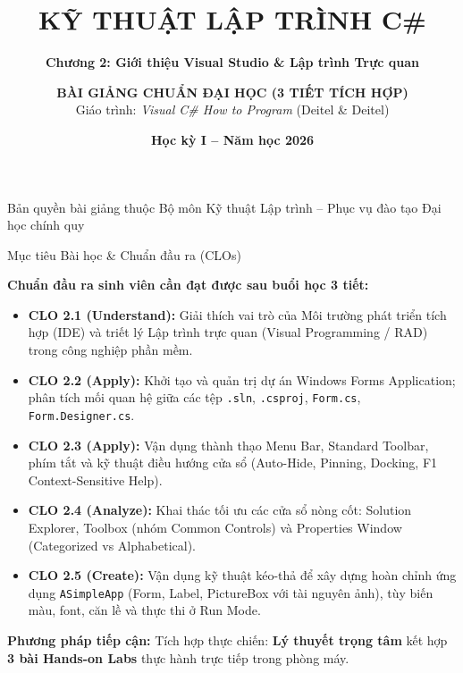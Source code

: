\documentclass[aspectratio=169, 10pt]{beamer}
\title[\textbf{Lập trình C\# \& .NET -- Chương 2}]{\textbf{\LARGE KỸ THUẬT LẬP TRÌNH C\#}}
\subtitle{\textbf{\large Chương 2: Giới thiệu Visual Studio \& Lập trình Trực quan}}
\author[\textbf{Khoa CNTT -- IT26M}]{\textbf{BÀI GIẢNG CHUẨN ĐẠI HỌC (3 TIẾT TÍCH HỢP)}\\Giáo trình: \textit{Visual C\# How to Program} (Deitel \& Deitel)}
\institute[\textbf{Lớp IT26M}]{\textbf{Khoa Công nghệ Thông tin -- Đại học Đông Á}\\\textbf{Đối tượng:} Lớp IT26M (Khóa 2026)}
\date[\textbf{2026}]{\textbf{Học kỳ I -- Năm học 2026}}
\begin{document}
\begin{frame}[plain]
  \titlepage
  \begin{center}
    \scriptsize \color{gray} Bản quyền bài giảng thuộc Bộ môn Kỹ thuật Lập trình -- Phục vụ đào tạo Đại học chính quy
  \end{center}
\end{frame}

\begin{frame}{Mục tiêu Bài học \& Chuẩn đầu ra (CLOs)}
  \begin{block}{\textbf{Chuẩn đầu ra sinh viên cần đạt được sau buổi học 3 tiết:}}
    \begin{itemize}
      \item \textbf{CLO 2.1 (Understand):} Giải thích vai trò của Môi trường phát triển tích hợp (IDE) và triết lý Lập trình trực quan (Visual Programming / RAD) trong công nghiệp phần mềm.
      \item \textbf{CLO 2.2 (Apply):} Khởi tạo và quản trị dự án Windows Forms Application; phân tích mối quan hệ giữa các tệp \texttt{.sln}, \texttt{.csproj}, \texttt{Form.cs}, \texttt{Form.Designer.cs}.
      \item \textbf{CLO 2.3 (Apply):} Vận dụng thành thạo Menu Bar, Standard Toolbar, phím tắt và kỹ thuật điều hướng cửa sổ (Auto-Hide, Pinning, Docking, F1 Context-Sensitive Help).
      \item \textbf{CLO 2.4 (Analyze):} Khai thác tối ưu các cửa sổ nòng cốt: Solution Explorer, Toolbox (nhóm Common Controls) và Properties Window (Categorized vs Alphabetical).
      \item \textbf{CLO 2.5 (Create):} Vận dụng kỹ thuật kéo-thả để xây dựng hoàn chỉnh ứng dụng \texttt{ASimpleApp} (Form, Label, PictureBox với tài nguyên ảnh), tùy biến màu, font, căn lề và thực thi ở Run Mode.
    \end{itemize}
  \end{block}
  \vspace{-2mm}
  \begin{exampleblock}{\textbf{Phương pháp tiếp cận:}}
    Tích hợp thực chiến: \textbf{Lý thuyết trọng tâm} kết hợp \textbf{3 bài Hands-on Labs} thực hành trực tiếp trong phòng máy.
  \end{exampleblock}
\end{frame}
\end{document}
